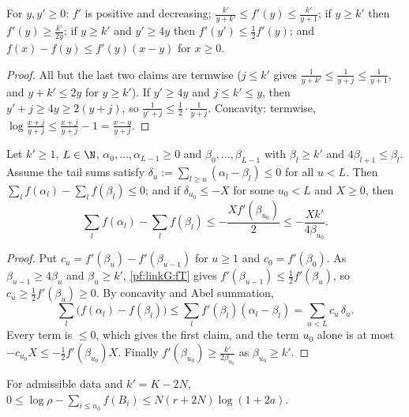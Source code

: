 \begin{lemma}[Properties of $f$]\label{pf:linkG:fT}
For $y,y'\ge0$: $f'$ is positive and decreasing; $\frac{k'}{y+k'}\le f'(y)\le\frac{k'}{y+1}$; if $y\ge k'$ then $f'(y)\ge\frac{k'}{2y}$;
if $y\ge k'$ and $y'\ge4y$ then $f'(y')\le\frac12f'(y)$; and $f(x)-f(y)\le f'(y)(x-y)$ for $x\ge0$.
\end{lemma}

\begin{proof}
All but the last two claims are termwise ($j\le k'$ gives $\frac1{y+k'}\le\frac1{y+j}\le\frac1{y+1}$, and $y+k'\le2y$ for $y\ge k'$).
If $y'\ge4y$ and $j\le k'\le y$, then $y'+j\ge4y\ge2(y+j)$, so $\frac1{y'+j}\le\frac12\cdot\frac1{y+j}$. Concavity: termwise,
$\log\frac{x+j}{y+j}\le\frac{x+j}{y+j}-1=\frac{x-y}{y+j}$.
\end{proof}

\begin{lemma}\label{pf:linkG:deficit}
Let $k'\ge1$, $L\in\N$, $\alpha_0,\dots,\alpha_{L-1}\ge0$ and $\beta_0,\dots,\beta_{L-1}$ with $\beta_l\ge k'$ and $4\beta_{l+1}\le\beta_l$.
Assume the tail sums satisfy $\delta_u:=\sum_{l\ge u}(\alpha_l-\beta_l)\le0$ for all $u<L$. Then
$\sum_lf(\alpha_l)-\sum_lf(\beta_l)\le0$; and if $\delta_{u_0}\le-X$ for some $u_0<L$ and $X\ge0$, then
\[
\sum_lf(\alpha_l)-\sum_lf(\beta_l)\le-\frac{Xf'(\beta_{u_0})}2\le-\frac{Xk'}{4\beta_{u_0}} .
\]
\end{lemma}

\begin{proof}
Put $c_u=f'(\beta_u)-f'(\beta_{u-1})$ for $u\ge1$ and $c_0=f'(\beta_0)$. As $\beta_{u-1}\ge4\beta_u$ and $\beta_u\ge k'$,
\cref{pf:linkG:fT} gives $f'(\beta_{u-1})\le\frac12f'(\beta_u)$, so $c_u\ge\frac12f'(\beta_u)\ge0$. By concavity and Abel
summation,
\[
\sum_l\bigl(f(\alpha_l)-f(\beta_l)\bigr)\le\sum_lf'(\beta_l)(\alpha_l-\beta_l)=\sum_{u<L}c_u\,\delta_u .
\]
Every term is $\le0$, which gives the first claim, and the term $u_0$ alone is at most $-c_{u_0}X\le-\frac12f'(\beta_{u_0})X$.
Finally $f'(\beta_{u_0})\ge\frac{k'}{2\beta_{u_0}}$ as $\beta_{u_0}\ge k'$.
\end{proof}

\begin{lemma}\label{pf:linkG:logrank}
For admissible data and $k'=K-2N$, $0\le\log\rho-\sum_{i\le n_0}f(B_i)\le N(r+2N)\log(1+2a)$.
\end{lemma}

